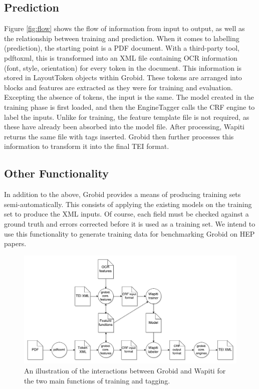 \subsection{Prediction}

Figure \ref{fig:flow} shows the flow of information from input to output, as well as the relationship between training and prediction. When it comes to labelling (prediction), the starting point is a PDF document. With a third-party tool, pdftoxml, this is transformed into an XML file containing OCR information (font, style, orientation) for every token in the document. This information is stored in LayoutToken objects within Grobid. These tokens are arranged into blocks and features are extracted as they were for training and evaluation. Excepting the absence of tokens, the input is the same. The model created in the training phase is first loaded, and then the EngineTagger calls the CRF engine to label the inputs. Unlike for training, the feature template file is not required, as these have already been absorbed into the model file. After processing, Wapiti returns the same file with tags inserted. Grobid then further processes this information to transform it into the final TEI format.

\subsection{Other Functionality}

In addition to the above, Grobid provides a means of producing training sets semi-automatically. This consists of applying the existing models on the training set to produce the XML inputs. Of course, each field must be checked against a ground truth and errors corrected before it is used as a training set. We intend to use this functionality to generate training data for benchmarking Grobid on HEP papers.

\begin{figure}[!ht]
\center
\includegraphics[width=\textwidth]{Figures/grobid.pdf}
\caption{An illustration of the interactions between Grobid and Wapiti for the two main functions of training and tagging.}
\label{fig:grobid}
\end{figure}

